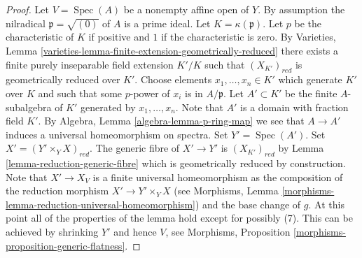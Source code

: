 \documentclass[10pt,a4paper]{amsart}
\theoremstyle{plain}
\theoremstyle{definition}
\theoremstyle{remark}
\numberwithin{equation}{subsection}
\def\Spec{\mathop{\mathrm{Spec}}}
\begin{document}
\begin{proof}
Let $V = \Spec(A)$ be a nonempty affine open of $Y$.
By assumption the nilradical $\mathfrak p = \sqrt{(0)}$ of $A$
is a prime ideal.
Let $K = \kappa(\mathfrak p)$.
Let $p$ be the characteristic of $K$ if positive and $1$
if the characteristic is zero. By
Varieties, Lemma \ref{varieties-lemma-finite-extension-geometrically-reduced}
there exists a finite purely inseparable field extension
$K'/K$ such that $(X_{K'})_{red}$ is geometrically reduced over $K'$.
Choose elements $x_1, \ldots, x_n \in K'$ which generate $K'$ over
$K$ and such that some $p$-power of $x_i$ is in $A/\mathfrak p$.
Let $A' \subset K'$ be the finite $A$-subalgebra of $K'$ generated by
$x_1, \ldots, x_n$. Note that $A'$ is a domain with fraction field $K'$. By
Algebra, Lemma \ref{algebra-lemma-p-ring-map}
we see that $A \to A'$ induces a universal homeomorphism on spectra.
Set $Y' = \Spec(A')$. Set $X' = (Y' \times_Y X)_{red}$.
The generic fibre of $X' \to Y'$ is $(X_{K'})_{red}$ by
Lemma \ref{lemma-reduction-generic-fibre}
which is geometrically reduced by construction.
Note that $X' \to X_V$ is a finite universal homeomorphism as the
composition of the reduction morphism $X' \to Y' \times_Y X$ (see
Morphisms, Lemma \ref{morphisms-lemma-reduction-universal-homeomorphism})
and the base change of $g$.
At this point all of the properties of the lemma hold except for
possibly (7). This can be achieved by shrinking $Y'$ and hence $V$, see
Morphisms, Proposition \ref{morphisms-proposition-generic-flatness}.
\end{proof}
\end{document}
